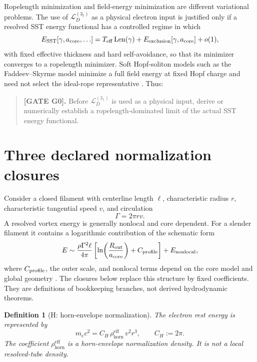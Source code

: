 \documentclass[aps,pre,preprint,notitlepage,nofootinbib,superscriptaddress]{revtex4-2}
\newcommand{\calL}{\mathcal L}
\newcommand{\rhohorn}{\rho_{\mathrm{horn}}^{\mathrm{eff}}}
\newtheorem{definition}{Definition}
\begin{document}
Ropelength minimization and field-energy minimization are different variational problems.  The use of \(\calL_D^{(3_1)}\) as a physical electron input is justified only if a resolved SST energy functional has a controlled regime in which
\begin{equation}
  E_{\rm SST}[\gamma,a_{\rm core},\ldots]
  =
  T_{\rm eff}\operatorname{Len}(\gamma)
  +E_{\rm exclusion}[\gamma,a_{\rm core}]
  +o(1),
  \label{eq:hard-tube-limit}
\end{equation}
with fixed effective thickness and hard self-avoidance, so that its minimizer converges to a ropelength minimizer.  Soft Hopf-soliton models such as the Faddeev--Skyrme model minimize a full field energy at fixed Hopf charge and need not select the ideal-rope representative \cite{Sutcliffe2007}.  Thus:

\begin{quote}
\textbf{[GATE G0].}
Before \(\calL_D^{(3_1)}\) is used as a physical input, derive or numerically establish a ropelength-dominated limit of the actual SST energy functional.
\end{quote}

\section{Three declared normalization closures}
\label{sec:closures}

Consider a closed filament with centerline length \(\ell\), characteristic radius \(r\), characteristic tangential speed \(v\), and circulation
\begin{equation}
  \Gamma=2\pi rv.
  \label{eq:circulation}
\end{equation}
A resolved vortex energy is generally nonlocal and core dependent.  For a slender filament it contains a logarithmic contribution of the schematic form
\begin{equation}
  E
  \sim
  \frac{\rho\Gamma^2\ell}{4\pi}
  \left[
    \ln\!\left(\frac{R_{\rm out}}{a_{\rm core}}\right)
    +C_{\rm profile}
  \right]
  +E_{\rm nonlocal},
  \label{eq:standard-line-energy}
\end{equation}
where \(C_{\rm profile}\), the outer scale, and nonlocal terms depend on the core model and global geometry \cite{Saffman1992}.  The closures below replace this structure by fixed coefficients.  They are definitions of bookkeeping branches, not derived hydrodynamic theorems.

\begin{definition}[H: horn-envelope normalization]
\label{def:H}
The electron rest energy is represented by
\begin{equation}
  m_ec^2
  =
  C_H\,\rhohorn\,v^2r^3,
  \qquad
  C_H:=2\pi.
  \label{eq:H}
\end{equation}
The coefficient \(\rhohorn\) is a horn-envelope normalization density.  It is not a local resolved-tube density.
\end{definition}
\end{document}
